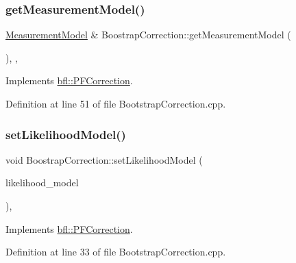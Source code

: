 \subsubsection{\texorpdfstring{get\+Measurement\+Model()}{getMeasurementModel()}}
{\footnotesize\ttfamily \mbox{\hyperlink{classbfl_1_1MeasurementModel}{Measurement\+Model}} \& Boostrap\+Correction\+::get\+Measurement\+Model (\begin{DoxyParamCaption}{ }\end{DoxyParamCaption})\hspace{0.3cm}{\ttfamily [override]}, {\ttfamily [protected]}, {\ttfamily [virtual]}}



Implements \mbox{\hyperlink{classbfl_1_1PFCorrection_a891c7d498caffb4d11e5ebdaa475c683}{bfl\+::\+P\+F\+Correction}}.



Definition at line 51 of file Bootstrap\+Correction.\+cpp.

\mbox{\label{classbfl_1_1BoostrapCorrection_a75d770c17ac4142833c926e9e6dc32db}} 
\subsubsection{\texorpdfstring{set\+Likelihood\+Model()}{setLikelihoodModel()}}
{\footnotesize\ttfamily void Boostrap\+Correction\+::set\+Likelihood\+Model (\begin{DoxyParamCaption}\item[{std\+::unique\+\_\+ptr$<$ \mbox{\hyperlink{classbfl_1_1LikelihoodModel}{Likelihood\+Model}} $>$}]{likelihood\+\_\+model }\end{DoxyParamCaption})\hspace{0.3cm}{\ttfamily [override]}, {\ttfamily [virtual]}}



Implements \mbox{\hyperlink{classbfl_1_1PFCorrection_aa84e757c694d4ad375cdd543d42ac34c}{bfl\+::\+P\+F\+Correction}}.



Definition at line 33 of file Bootstrap\+Correction.\+cpp.

\mbox{\label{classbfl_1_1BoostrapCorrection_af6e02e5d6e6426cbee2825a77c79da43}} 
